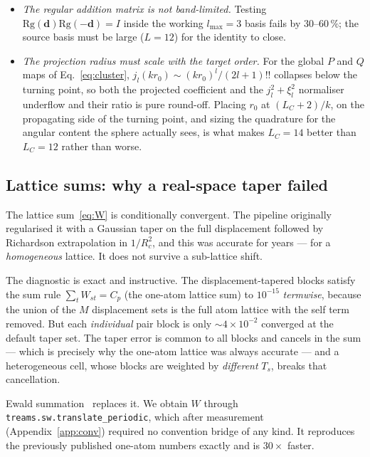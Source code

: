 \documentclass[11pt,a4paper]{article}
\newcommand{\lmax}{\ensuremath{l_{\max}}}
\newcommand{\code}[1]{\texttt{\small #1}}
\theoremstyle{plain}
\theoremstyle{definition}
\begin{document}
\begin{itemize}[leftmargin=*,itemsep=2pt]
\item \emph{The regular addition matrix is not band-limited.} Testing
      $\mathrm{Rg}(\mathbf{d})\mathrm{Rg}(-\mathbf{d}) = I$ inside the working
      $\lmax = 3$ basis fails by $30$--$60\,\%$; the source basis must be large
      ($L = 12$) for the identity to close.
\item \emph{The projection radius must scale with the target order.} For the
      global $P$ and $Q$ maps of Eq.~\eqref{eq:cluster}, $j_l(kr_0) \sim
      (kr_0)^l/(2l+1)!!$ collapses below the turning point, so both the projected
      coefficient and the $j_l^2 + \xi_l^2$ normaliser underflow and their ratio
      is pure round-off. Placing $r_0$ at $(L_C + 2)/k$, on the propagating side
      of the turning point, and sizing the quadrature for the angular content the
      sphere actually sees, is what makes $L_C = 14$ better than $L_C = 12$
      rather than worse.
\end{itemize}

\subsection{Lattice sums: why a real-space taper failed}
\label{sec:taper}

The lattice sum~\eqref{eq:W} is conditionally convergent. The pipeline originally
regularised it with a Gaussian taper on the full displacement followed by
Richardson extrapolation in $1/R_c^2$, and this was accurate for years --- for a
\emph{homogeneous} lattice. It does not survive a sub-lattice shift.

The diagnostic is exact and instructive. The displacement-tapered blocks satisfy
the sum rule $\sum_t W_{st} = C_p$ (the one-atom lattice sum) to $10^{-15}$
\emph{termwise}, because the union of the $M$ displacement sets is the full atom
lattice with the self term removed. But each \emph{individual} pair block is only
$\sim\!4\times10^{-2}$ converged at the default taper set. The taper error is
common to all blocks and cancels in the sum --- which is precisely why the
one-atom lattice was always accurate --- and a heterogeneous cell, whose blocks
are weighted by \emph{different} $T_s$, breaks that cancellation.

Ewald summation~\cite{ewald1921,beutel2023} replaces it. We obtain $W$ through
\code{treams.sw.translate\_periodic}, which after measurement (Appendix~\ref{app:conv})
required no convention bridge of any kind. It reproduces the previously published
one-atom numbers exactly and is $30\times$ faster.
\end{document}

